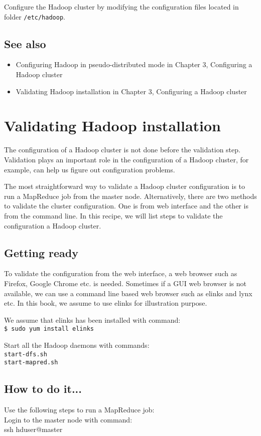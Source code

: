 Configure the Hadoop cluster by modifying the configuration files located in folder \verb|/etc/hadoop|. \\
\subsection*{See also}
\begin{itemize}
  \item Configuring Hadoop in pseudo-distributed mode in Chapter 3, Configuring a Hadoop cluster
  \item Validating Hadoop installation in Chapter 3, Configuring a Hadoop cluster
\end{itemize}

\section{Validating Hadoop installation}
The configuration of a Hadoop cluster is not done before the validation step. Validation plays an important role in the configuration of a Hadoop cluster, for example, can help us figure out configuration problems.

The most straightforward way to validate a Hadoop cluster configuration is to run a MapReduce job from the master node. Alternatively, there are two methods to validate the cluster configuration. One is from web interface and the other is from the command line. In this recipe, we will list steps to validate the configuration a Hadoop cluster.
\subsection*{Getting ready}
To validate the configuration from the web interface, a web browser such as Firefox, Google Chrome etc. is needed. Sometimes if a GUI web browser is not available, we can use a command line based web browser such as elinks and lynx etc. In this book, we assume to use elinks for illustration purpose.

We assume that elinks has been installed with command: \\
\verb|$ sudo yum install elinks|

Start all the Hadoop daemons with commands: \\
\verb|start-dfs.sh| \\
\verb|start-mapred.sh|

\subsection*{How to do it...}
Use the following steps to run a MapReduce job: \\
Login to the master node with command: \\
ssh hduser@master

